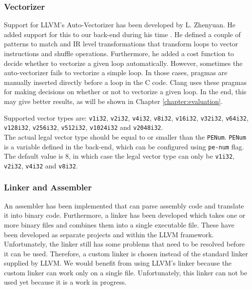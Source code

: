\subsubsection{Vectorizer}
 Support for LLVM's Auto-Vectorizer has been developed by L. Zhenyuan. He added support for this to our back-end during his time \cite[Chapter~5]{liu_zhenyuan}. He defined a couple of patterns to match and IR level transformations that transform loops to vector instructions and shuffle operations. Furthermore, he added a cost function to decide whether to vectorize a given loop automatically. However, sometimes the auto-vectorizer fails to vectorize a simple loop. In those cases, pragmas are manually inserted directly before a loop in the C code. Clang uses these pragmas for making decisions on whether or not to vectorize a given loop. In the end, this may give better results, as will be shown in Chapter \ref{chapter:evaluation}.
 
 Supported vector types are:
 \texttt{v1i32}, \texttt{v2i32}, \texttt{v4i32}, \texttt{v8i32}, \texttt{v16i32}, \texttt{v32i32}, \texttt{v64i32}, \texttt{v128i32}, \texttt{v256i32}, \texttt{v512i32}, \texttt{v1024i32} and \texttt{v2048i32}.\\
	The actual legal vector type should be equal to or smaller than the \texttt{PENum}. \texttt{PENum} is a variable defined in the back-end, which can be configured using \texttt{pe-num} flag. The default value is 8, in which case the legal vector type can only be \texttt{v1i32}, \texttt{v2i32}, \texttt{v4i32} and \texttt{v8i32}.

\subsubsection{Linker and Assembler}
An assembler has been implemented that can parse assembly code and translate it into binary code. Furthermore, a linker has been developed which takes one or more binary files and combines them into a single executable file. These have been developed as separate projects and within the LLVM framework. Unfortunately, the linker still has some problems that need to be resolved before it can be used. %
Therefore, a custom linker is chosen instead of the standard linker supplied by LLVM. We would benefit from using LLVM's linker because the custom linker can work only on a single file. Unfortunately, this linker can not be used yet because it is a work in progress.%


